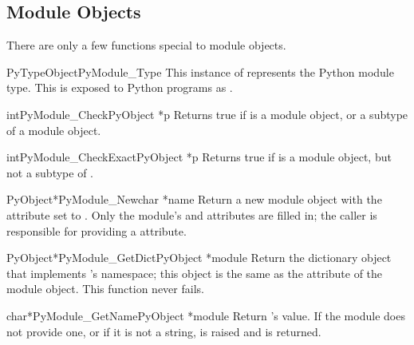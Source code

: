 \subsection{Module Objects \label{moduleObjects}}

There are only a few functions special to module objects.

\begin{cvardesc}{PyTypeObject}{PyModule_Type}
  This instance of  represents the Python module
  type.  This is exposed to Python programs as
  .
\end{cvardesc}

\begin{cfuncdesc}{int}{PyModule_Check}{PyObject *p}
  Returns true if  is a module object, or a subtype of a module
  object.
\end{cfuncdesc}

\begin{cfuncdesc}{int}{PyModule_CheckExact}{PyObject *p}
  Returns true if  is a module object, but not a subtype of
  .
\end{cfuncdesc}

\begin{cfuncdesc}{PyObject*}{PyModule_New}{char *name}
  Return a new module object with the  attribute set
  to .  Only the module's  and
   attributes are filled in; the caller is
  responsible for providing a  attribute.
\end{cfuncdesc}

\begin{cfuncdesc}{PyObject*}{PyModule_GetDict}{PyObject *module}
  Return the dictionary object that implements 's
  namespace; this object is the same as the 
  attribute of the module object.  This function never fails.
\end{cfuncdesc}

\begin{cfuncdesc}{char*}{PyModule_GetName}{PyObject *module}
  Return 's  value.  If the module does
  not provide one, or if it is not a string, 
  is raised and \NULL{} is returned.
\end{cfuncdesc}

